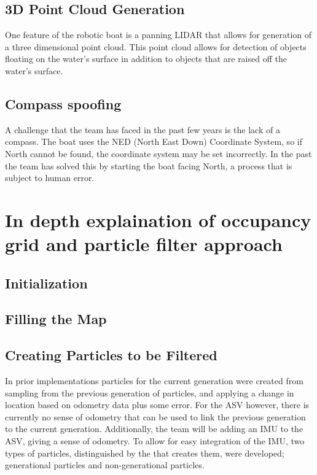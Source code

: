 \documentclass[10pt]{IEEEtran}
\begin{document}
\subsection{3D Point Cloud Generation}
One feature of the robotic boat is a panning LIDAR that allows for generation of a three 
dimensional point cloud.  This point cloud allows for detection of objects floating on the
water's surface in addition to objects that are raised off the water's surface.  

\subsection{Compass spoofing}
A challenge that the team has faced in the past few years is the lack of a compass.  
The boat uses the NED (North East Down) Coordinate System, so if North cannot be found, 
the coordinate system may be set incorrectly.  In the past the team has solved this by
starting the boat facing North, a process that is subject to human error. %

\section{In depth explaination of occupancy grid and particle filter approach}

\subsection{Initialization}%

\subsection{Filling the Map}

\subsection{Creating Particles to be Filtered}
In prior implementations particles for the current generation were created from sampling from
the previous generation of particles, and applying a change in location based on odometry 
data plus some error.  For the ASV however, there is currently no sense of odometry that 
can be used to link the previous generation to the current generation.  Additionally, the 
team will be adding an IMU to the ASV, giving a sense of odometry.  To allow for easy 
integration of the IMU, two types of particles, distinguished by the that creates them,
were developed; generational particles and non-generational particles.
\end{document}
